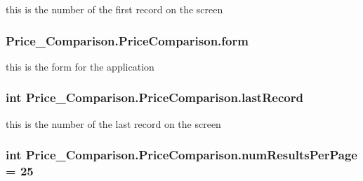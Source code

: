 this is the number of the first record on the screen \hypertarget{class_price___comparison_1_1_price_comparison_a59d01fc0b61a9d6d4e869663f2b39f78}{
\subsubsection[{form}]{ Price\-\_\-\-Comparison.\-Price\-Comparison.\-form\hspace{0.3cm}{\ttfamily [static]}}}\label{class_price___comparison_1_1_price_comparison_a59d01fc0b61a9d6d4e869663f2b39f78}
this is the form for the application \hypertarget{class_price___comparison_1_1_price_comparison_a7cbb85e5ca4e62a1f47c3b5dfa9e2659}{
\subsubsection[{last\-Record}]{\setlength{\rightskip}{0pt plus 5cm}int Price\-\_\-\-Comparison.\-Price\-Comparison.\-last\-Record\hspace{0.3cm}{\ttfamily [static]}}}\label{class_price___comparison_1_1_price_comparison_a7cbb85e5ca4e62a1f47c3b5dfa9e2659}
this is the number of the last record on the screen \hypertarget{class_price___comparison_1_1_price_comparison_a03ce8e6d675cf14e9f3ab91015559ae5}{
\subsubsection[{num\-Results\-Per\-Page}]{\setlength{\rightskip}{0pt plus 5cm}int Price\-\_\-\-Comparison.\-Price\-Comparison.\-num\-Results\-Per\-Page = 25\hspace{0.3cm}{\ttfamily [static]}}}\label{class_price___comparison_1_1_price_comparison_a03ce8e6d675cf14e9f3ab91015559ae5}
